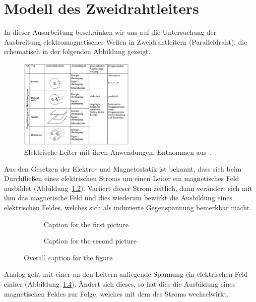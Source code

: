 \documentclass[paper=a4, parskip=half-, ngerman, fontsize=11pt]{scrreprt}
\begin{document}
\chapter{Modell des Zweidrahtleiters}

In dieser Ausarbeitung beschränken wir uns auf die Untersuchung der Ausbreitung elektromagnetischer Wellen in
Zweidrahtleitern (Paralleldraht), die schematisch in der folgenden Abbildung gezeigt.
\begin{figure}[!h]
    \begin{center}
        \includegraphics[width=0.5\textwidth]{images/Leiter.png}
        \caption{Elektrische Leiter mit ihren Anwendungen. Entnommen aus~\cite{FernuniSkript}.}
        \label{Leiter}
    \end{center}
\end{figure}

Aus den Gesetzen der Elektro- und Magnetostatik ist bekannt, dass sich beim Durchfließen eines elektrischen Stroms um
einen Leiter ein magnetisches Feld ausbildet (Abbildung~\ref{Felder1}). Variiert dieser Strom zeitlich, dann
verändert sich mit ihm das magnetische Feld und dies wiederum bewirkt die Ausbildung eines elektrischen Feldes, welches
sich als induzierte Gegenspannung bemerkbar macht.
\begin{figure}[!ht]
    \begin{subfigure}[b]{0.49\textwidth}
        \centering
        
        \caption{\color{red}Caption for the first picture}
        \label{Felder1}
    \end{subfigure}%
    \hfill
    \begin{subfigure}[b]{0.49\textwidth}
        \centering
        
        \caption{\color{red}Caption for the second picture}
        \label{Felder2}
    \end{subfigure}
    \caption{\color{red}Overall caption for the figure}
\end{figure}
Analog geht mit einer an den Leitern anliegende Spannung ein elektrischen Feld einher (Abbildung~\ref{Felder2}).
Ändert sich dieses, so hat dies die Ausbildung eines magnetischen Feldes zur Folge, welches mit dem des Stroms
wechselwirkt.
\end{document}
